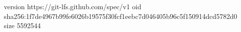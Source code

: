 version https://git-lfs.github.com/spec/v1
oid sha256:1f7de4967b99fe6026b19575f30fcf1eebc7d046405b96c5f150914dcd5782d0
size 5592544
